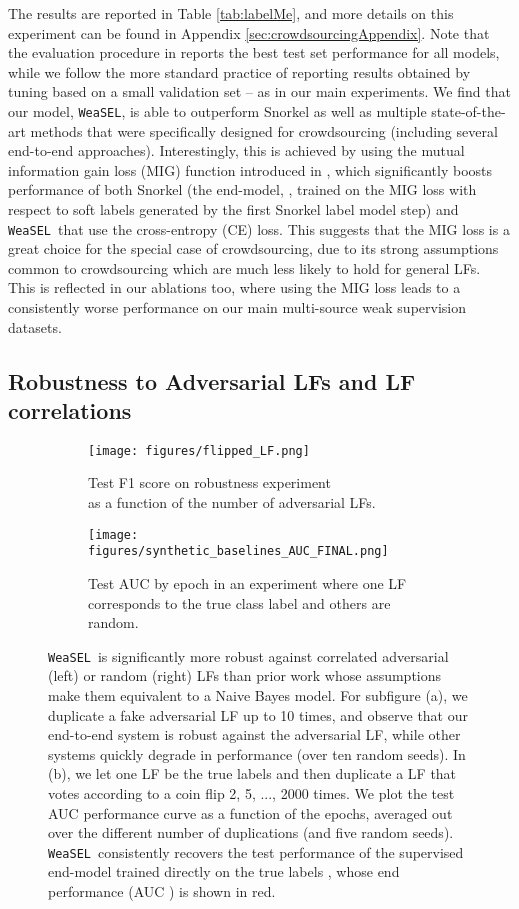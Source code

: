 \documentclass{article}
\newcommand{\weasel}{\texttt{WeaSEL}}\newcommand{\brackets}[1]{\left( #1 \right)}
\begin{document}
The results are reported in Table \ref{tab:labelMe}, and more details on this experiment can be found in Appendix \ref{sec:crowdsourcingAppendix}.
Note that the evaluation procedure in \cite{MaxMIG} reports the best test set performance for all models, while we follow the more standard practice of reporting results obtained by tuning based on a small validation set -- as in our main experiments.
We find that our model, \weasel, is able to outperform Snorkel as well as multiple state-of-the-art methods that were specifically designed for crowdsourcing (including several end-to-end approaches).
Interestingly, this is achieved by using the mutual information gain loss (MIG) function introduced in \cite{MaxMIG}, which significantly boosts performance of both Snorkel (the end-model, , trained on the MIG loss with respect to soft labels generated by the first Snorkel label model step) and \weasel\ that use the cross-entropy (CE) loss.
This suggests that the MIG loss is a great choice for the special case of crowdsourcing, due to its strong assumptions common to crowdsourcing which are much less likely to hold for general LFs. This is reflected in our ablations too, where using the MIG loss leads to a consistently worse performance on our main multi-source weak supervision datasets.
\subsection{Robustness to Adversarial LFs and LF correlations}
\label{sec:mainRobustness}
\begin{figure}
    \begin{subfigure}{.5\textwidth}
      \centering
      \texttt{[image: figures/flipped\_LF.png]}
      \caption{Test F1 score on robustness experiment \\ as a function of the number of adversarial LFs.}
      \label{fig:noisyLF}
    \end{subfigure}\begin{subfigure}{.5\textwidth}
      \centering
      \texttt{[image: figures/synthetic\_baselines\_AUC\_FINAL.png]}
      \caption{Test AUC by epoch in an experiment where one LF corresponds to the true class label and others are random.}
      \label{fig:SynthRobustnessTestCurve}
    \end{subfigure}
    \caption{
    \weasel\ is significantly more robust against correlated adversarial (left) or random (right) LFs than prior work whose assumptions make them equivalent to a Naive Bayes model.
    For subfigure (a), we duplicate a fake adversarial LF up to 10 times, and observe that our end-to-end system is robust against the adversarial LF, while other systems quickly degrade in performance (over ten random seeds). In (b), we let one LF be the true labels  and then duplicate a LF that votes according to a coin flip 2, 5, ..., 2000 times. We plot the test AUC performance curve as a function of the epochs, averaged out over the different number of duplications (and five random seeds). \weasel\ consistently recovers the test performance of the supervised end-model  trained directly on the true labels , whose end performance (AUC ) is shown in red. 
}
  \label{fig:mainRobustness}
\end{figure}
\end{document}
